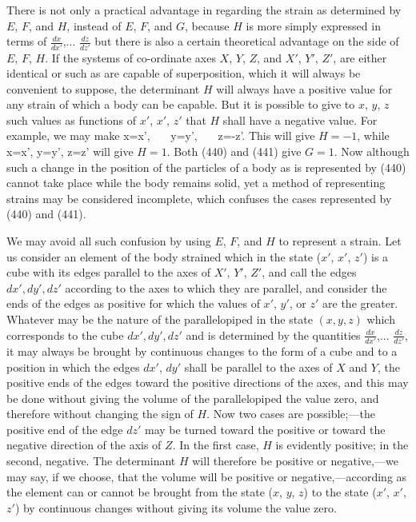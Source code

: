 \documentclass[12pt]{article}
\begin{document}
{There is not only a practical advantage in regarding the strain as determined by $E$, $F$, and $H$, instead of $E$, $F$, and $G$, because $H$ is more simply expressed in terms of $\frac{dx}{dx'}$,... $\frac{dz}{dz'}$ but there is also a certain theoretical advantage on the side of $E$, $F$, $H$. If the systems of co-ordinate axes $X$, $Y$, $Z$, and $X'$, $Y'$, $Z'$, are either identical or such as are capable of superposition, which it will always be convenient to suppose, the determinant $H$ will always have a positive value for any strain of which a body can be capable. But it is possible to give to $x$, $y$, $z$ such values as functions of $x'$, $x'$, $z'$ that $H$ shall have a negative value. For example, we may make
\eqs x=x', \ \ \ y=y', \ \ \ z=-z'.    \label{440}\eqe
This will give $H= -1$, while
\eqs x=x', y=y', z=z'     \label{441}\eqe
will give $H=1$. Both (440) and (441) give $G=1$. Now although such a change in the position of the particles of a body as is represented by (440) cannot take place while the body remains solid, yet a method of representing strains may be considered incomplete, which confuses the cases represented by (440) and (441).


We may avoid all such confusion by using $E$, $F$, and $H$ to represent a strain. Let us consider an element of the body strained which in the state ($x'$, $x'$, $z'$) is a cube with its edges parallel to the axes of $X'$, $Y'$, $Z'$, and call the edges $dx', dy', dz'$ according to the axes to which they are parallel, and consider the ends of the edges as positive for which the values of $x'$, $y'$, or $z'$ are the greater. Whatever may be the nature of the parallelopiped in the state $(x, y, z)$ which corresponds to the cube $dx', dy', dz'$ and is determined by the quantities $\frac{dx}{dx'}$,... $\frac{dz}{dz'}$, it may always be brought by continuous changes to the form of a cube and to a position in which the edges $dx'$, $dy'$ shall be parallel to the axes of $X$ and $Y$, the positive ends of the edges toward the positive directions of the axes, and this may be done without giving the volume of the parallelopiped the value zero, and therefore without changing the sign of $H$.  Now two cases are possible;---the positive end of the edge $dz'$ may be turned toward the positive or toward the negative direction of the axis of $Z$. In the first case, $H$ is evidently positive; in the second, negative. The determinant $H$ will therefore be positive or negative,---we may say, if we choose, that the volume will be positive or negative,---according as the element can or cannot be brought from the state ($x$, $y$, $z$) to the state ($x'$, $x'$, $z'$) by continuous changes without giving its volume the value zero.


}
\end{document}
